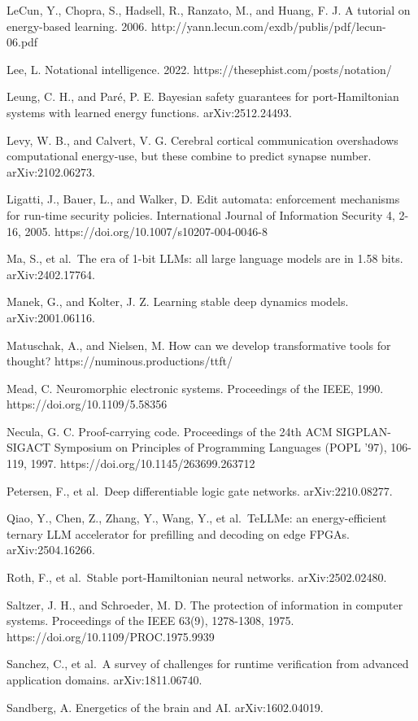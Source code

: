 \documentclass[
  10pt,
]{article}
\begin{document}
LeCun, Y., Chopra, S., Hadsell, R., Ranzato, M., and Huang, F. J. A
tutorial on energy-based learning. 2006.
http://yann.lecun.com/exdb/publis/pdf/lecun-06.pdf

Lee, L. Notational intelligence. 2022.
https://thesephist.com/posts/notation/

Leung, C. H., and Paré, P. E. Bayesian safety guarantees for
port-Hamiltonian systems with learned energy functions.
arXiv:2512.24493.

Levy, W. B., and Calvert, V. G. Cerebral cortical communication
overshadows computational energy-use, but these combine to predict
synapse number. arXiv:2102.06273.

Ligatti, J., Bauer, L., and Walker, D. Edit automata: enforcement
mechanisms for run-time security policies. International Journal of
Information Security 4, 2-16, 2005.
https://doi.org/10.1007/s10207-004-0046-8

Ma, S., et al.~The era of 1-bit LLMs: all large language models are in
1.58 bits. arXiv:2402.17764.

Manek, G., and Kolter, J. Z. Learning stable deep dynamics models.
arXiv:2001.06116.

Matuschak, A., and Nielsen, M. How can we develop transformative tools
for thought? https://numinous.productions/ttft/

Mead, C. Neuromorphic electronic systems. Proceedings of the IEEE, 1990.
https://doi.org/10.1109/5.58356

Necula, G. C. Proof-carrying code. Proceedings of the 24th ACM
SIGPLAN-SIGACT Symposium on Principles of Programming Languages (POPL
'97), 106-119, 1997. https://doi.org/10.1145/263699.263712

Petersen, F., et al.~Deep differentiable logic gate networks.
arXiv:2210.08277.

Qiao, Y., Chen, Z., Zhang, Y., Wang, Y., et al.~TeLLMe: an
energy-efficient ternary LLM accelerator for prefilling and decoding on
edge FPGAs. arXiv:2504.16266.

Roth, F., et al.~Stable port-Hamiltonian neural networks.
arXiv:2502.02480.

Saltzer, J. H., and Schroeder, M. D. The protection of information in
computer systems. Proceedings of the IEEE 63(9), 1278-1308, 1975.
https://doi.org/10.1109/PROC.1975.9939

Sanchez, C., et al.~A survey of challenges for runtime verification from
advanced application domains. arXiv:1811.06740.

Sandberg, A. Energetics of the brain and AI. arXiv:1602.04019.
\end{document}
